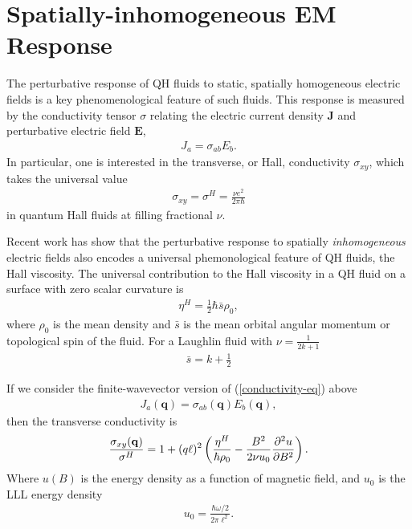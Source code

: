 \documentclass[aps,prb,twocolumn,letterpaper,twoside,nobalancelastpage,groupedaddress,amsmath,amssymb,floatfix,citeautoscript]{revtex4-1}
\begin{document}
\section{Spatially-inhomogeneous EM Response}
The perturbative response of QH fluids to static, spatially homogeneous electric fields is a key phenomenological feature of such fluids. This response is measured by the conductivity tensor $\sigma$ relating the electric current density $\mathbf{J}$ and perturbative electric field $\mathbf{E}$,
\begin{align}
\label{conductivity-eq}
J_{a} = \sigma_{ab}E_b.
\end{align}
In particular, one is interested in the transverse, or Hall, conductivity $\sigma_{xy}$, which takes the universal value
\begin{align*}
\sigma_{xy} = \sigma^{H} = \frac{\nu e^2}{2\pi \hbar}
\end{align*}
in quantum Hall fluids at filling fractional $\nu$.

Recent work has show that the perturbative response to spatially \textit{inhomogeneous} electric fields also encodes a universal phemonological feature of QH fluids, the Hall viscosity. The universal contribution to the Hall viscosity in a QH fluid on a surface with zero scalar curvature is\cite{Read2009}
\begin{align*}
\eta^H = \frac{1}{2}\hbar\bar{s}\rho_0,
\end{align*}
where $\rho_0$ is the mean density and $\bar{s}$ is the mean orbital angular momentum or topological spin of the fluid. For a Laughlin fluid with $\nu = \frac{1}{2k+1}$
\begin{align*}
\bar{s} = k + \frac{1}{2}
\end{align*}

If we consider the finite-wavevector version of (\ref{conductivity-eq}) above
\begin{align*}
J_{a}(\mathbf{q}) = \sigma_{ab}(\mathbf{q})E_b(\mathbf{q}),
\end{align*}
then the transverse conductivity is
\begin{align*}
\frac{\sigma_{xy}(\mathbf{q})}{\sigma^{H}} = 1 + (q\ell)^2\left(\frac{\eta^H}{\hbar \rho_0} - \frac{B^2}{2\nu u_{0}}\pdv[2]{u}{B}\right).
\end{align*}
Where $u(B)$ is the energy density as a function of magnetic field, and $u_0$ is the LLL energy density 
\begin{align*}
u_{0} = \frac{\hbar\omega/2}{2\pi\ell^2}.
\end{align*}
\end{document}
